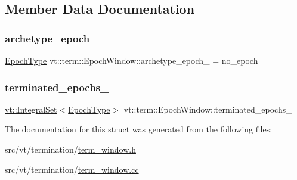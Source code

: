 \subsection{Member Data Documentation}
\mbox{\label{structvt_1_1term_1_1_epoch_window_a2ec27163c2e9a925fc97587364965ad3}} 
\subsubsection{\texorpdfstring{archetype\+\_\+epoch\+\_\+}{archetype\_epoch\_}}
{\footnotesize\ttfamily \hyperlink{namespacevt_a985a5adf291c34a3ca263b3378388236}{Epoch\+Type} vt\+::term\+::\+Epoch\+Window\+::archetype\+\_\+epoch\+\_\+ = no\+\_\+epoch\hspace{0.3cm}{\ttfamily [private]}}

\mbox{\label{structvt_1_1term_1_1_epoch_window_a08cdffaeea9d883542529b221b6c8fc9}} 
\subsubsection{\texorpdfstring{terminated\+\_\+epochs\+\_\+}{terminated\_epochs\_}}
{\footnotesize\ttfamily \hyperlink{namespacevt_af8fc7210a3d8e598330cf3375857ef1e}{vt\+::\+Integral\+Set}$<$\hyperlink{namespacevt_a985a5adf291c34a3ca263b3378388236}{Epoch\+Type}$>$ vt\+::term\+::\+Epoch\+Window\+::terminated\+\_\+epochs\+\_\+\hspace{0.3cm}{\ttfamily [private]}}



The documentation for this struct was generated from the following files\+:\begin{DoxyCompactItemize}
\item 
src/vt/termination/\hyperlink{term__window_8h}{term\+\_\+window.\+h}\item 
src/vt/termination/\hyperlink{term__window_8cc}{term\+\_\+window.\+cc}\end{DoxyCompactItemize}

